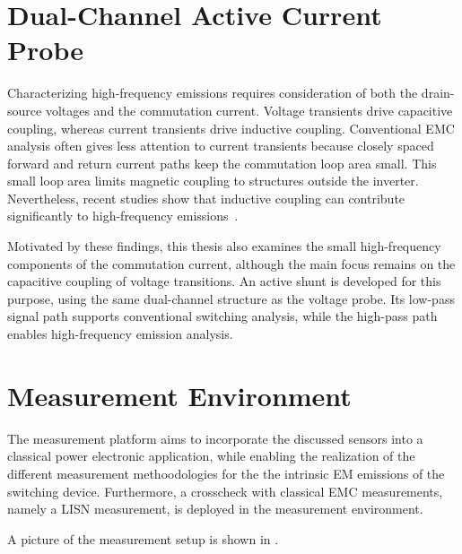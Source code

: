 




\section{Dual-Channel Active Current Probe}
\label{ch:AShunt}

Characterizing high-frequency emissions requires consideration of both the drain-source voltages and the commutation current.
Voltage transients drive capacitive coupling, whereas current transients drive inductive coupling.
Conventional EMC analysis often gives less attention to current transients because closely spaced forward and return current paths keep the commutation loop area small.
This small loop area limits magnetic coupling to structures outside the inverter.
Nevertheless, recent studies show that inductive coupling can contribute significantly to high-frequency emissions~\cite{hamami_identifying_2026}.

Motivated by these findings, this thesis also examines the small high-frequency components of the commutation current, although the main focus remains on the capacitive coupling of voltage transitions.
An active shunt is developed for this purpose, using the same dual-channel structure as the voltage probe.
Its low-pass signal path supports conventional switching analysis, while the high-pass path enables high-frequency emission analysis.





\section{Measurement Environment}
\label{sec:Environment}

The measurement platform aims to incorporate the discussed sensors into a classical power electronic application, while enabling the realization of the different measurement methoodologies for the the intrinsic EM emissions of the switching device.
Furthermore, a crosscheck with classical EMC measurements, namely a LISN measurement, is deployed in the measurement environment.

A picture of the measurement setup is shown in .


